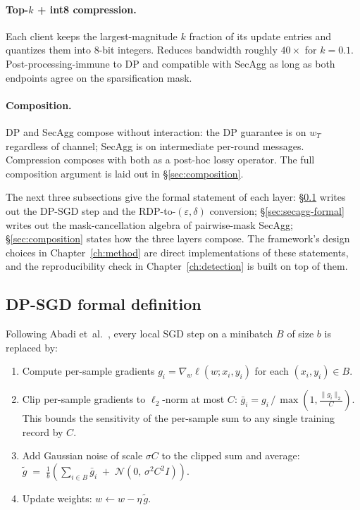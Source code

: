 \documentclass[11pt,a4paper]{report}
\begin{document}
\paragraph{Top-$k$ + int8 compression.}
Each client keeps the largest-magnitude $k$ fraction of its update entries
and quantizes them into 8-bit integers. Reduces bandwidth roughly $40\times$
for $k = 0.1$. Post-processing-immune to DP and compatible with SecAgg as
long as both endpoints agree on the sparsification mask.

\paragraph{Composition.}
DP and SecAgg compose without interaction: the DP guarantee is on $w_T$
regardless of channel; SecAgg is on intermediate per-round messages.
Compression composes with both as a post-hoc lossy operator. The full
composition argument is laid out in \S\ref{sec:composition}.

\medskip
The next three subsections give the formal statement of each layer:
\S\ref{sec:dpsgd-formal} writes out the DP-SGD step and the RDP-to-$(\varepsilon,
\delta)$ conversion; \S\ref{sec:secagg-formal} writes out the
mask-cancellation algebra of pairwise-mask SecAgg; \S\ref{sec:composition}
states how the three layers compose. The framework's design choices in
Chapter~\ref{ch:method} are direct implementations of these statements, and
the reproducibility check in Chapter~\ref{ch:detection} is built on top of
them.

\subsection{DP-SGD formal definition}\label{sec:dpsgd-formal}

Following Abadi et~al.~\cite{abadi2016dpsgd}, every local SGD step on a
minibatch $B$ of size $b$ is replaced by:

\begin{enumerate}[leftmargin=*]
  \item Compute per-sample gradients
        $g_i = \nabla_w \ell(w; x_i, y_i)$ for each $(x_i, y_i) \in B$.
  \item Clip per-sample gradients to $\ell_2$-norm at most $C$:
        $\bar g_i = g_i \,/\, \max\!\left(1, \tfrac{\|g_i\|_2}{C}\right)$.
        This bounds the sensitivity of the per-sample sum to any single
        training record by $C$.
  \item Add Gaussian noise of scale $\sigma C$ to the clipped sum and
        average:
        $\tilde g \;=\; \tfrac{1}{b}\!\left(\sum_{i \in B} \bar g_i \;+\;
         \mathcal{N}(0,\, \sigma^2 C^2 I)\right)$.
  \item Update weights: $w \leftarrow w - \eta \,\tilde g$.
\end{enumerate}
\end{document}
